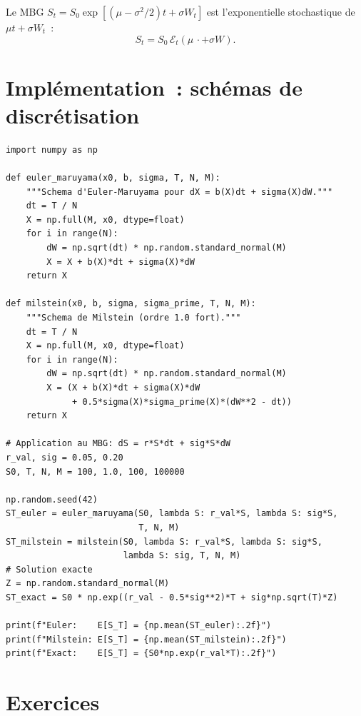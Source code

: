 \begin{proposition}
Le MBG $S_t = S_0\exp\!\left[(\mu - \sigma^2/2)t + \sigma W_t\right]$
est l'exponentielle stochastique de $\mu t + \sigma W_t$~:
\[
    S_t = S_0\,\mathcal{E}_t(\mu\,\cdot + \sigma W).
\]
\end{proposition}

\section{Impl\'ementation~: sch\'emas de discr\'etisation}

\begin{codeblock}[title=\textbf{Sch\'emas d'Euler et de Milstein}]
\begin{verbatim}
import numpy as np

def euler_maruyama(x0, b, sigma, T, N, M):
    """Schema d'Euler-Maruyama pour dX = b(X)dt + sigma(X)dW."""
    dt = T / N
    X = np.full(M, x0, dtype=float)
    for i in range(N):
        dW = np.sqrt(dt) * np.random.standard_normal(M)
        X = X + b(X)*dt + sigma(X)*dW
    return X

def milstein(x0, b, sigma, sigma_prime, T, N, M):
    """Schema de Milstein (ordre 1.0 fort)."""
    dt = T / N
    X = np.full(M, x0, dtype=float)
    for i in range(N):
        dW = np.sqrt(dt) * np.random.standard_normal(M)
        X = (X + b(X)*dt + sigma(X)*dW
             + 0.5*sigma(X)*sigma_prime(X)*(dW**2 - dt))
    return X

# Application au MBG: dS = r*S*dt + sig*S*dW
r_val, sig = 0.05, 0.20
S0, T, N, M = 100, 1.0, 100, 100000

np.random.seed(42)
ST_euler = euler_maruyama(S0, lambda S: r_val*S, lambda S: sig*S,
                          T, N, M)
ST_milstein = milstein(S0, lambda S: r_val*S, lambda S: sig*S,
                       lambda S: sig, T, N, M)
# Solution exacte
Z = np.random.standard_normal(M)
ST_exact = S0 * np.exp((r_val - 0.5*sig**2)*T + sig*np.sqrt(T)*Z)

print(f"Euler:    E[S_T] = {np.mean(ST_euler):.2f}")
print(f"Milstein: E[S_T] = {np.mean(ST_milstein):.2f}")
print(f"Exact:    E[S_T] = {S0*np.exp(r_val*T):.2f}")
\end{verbatim}
\end{codeblock}

\section{Exercices}

